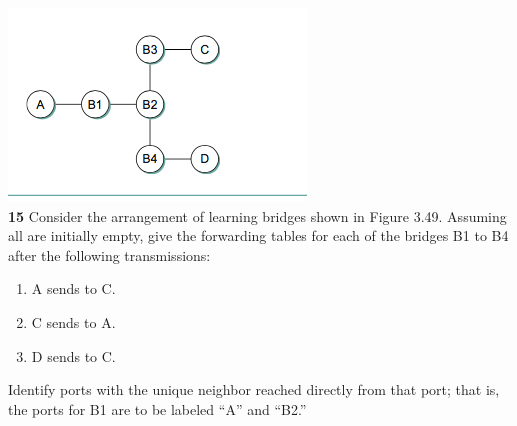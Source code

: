 \documentclass[11pt]{article}
\begin{document}
\includegraphics{ch3_15}\\
\textbf{15} Consider the arrangement of learning bridges shown in
Figure 3.49. Assuming all are initially empty, give the forwarding tables for each of the bridges B1 to B4 after the following transmissions:
\begin{enumerate}
    \item A sends to C.
    \item C sends to A.
    \item D sends to C.
\end{enumerate}
Identify ports with the unique neighbor reached directly from that port; that is, the ports for B1 are to be labeled “A” and “B2.”
\end{document}
